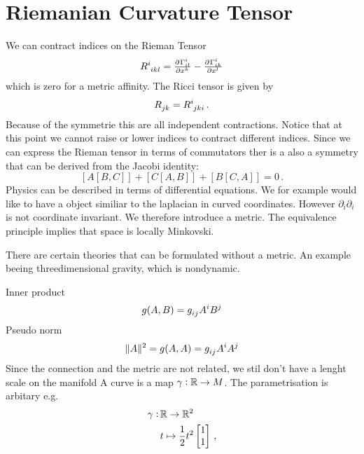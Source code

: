 \section{Riemanian Curvature Tensor}
We can contract indices on the Rieman Tensor
\begin{equation}
\tensor{R}{^i_i_k_l}=\pd{{\Gamma^i_{il}}}{{x^k}}-\pd{{\Gamma^i_{ik}}}{{x^l}}
\end{equation}
which is zero for a metric affinity. The Ricci tensor is given by
\begin{equation}
\tensor{R}{_j_k}=\tensor{R}{^i_j_k_i}\, .
\end{equation}
Because of the symmetrie this are all independent contractions. Notice that at
this point we cannot raise or lower indices to contract different indices.
Since we can express the Rieman tensor in terms of commutators ther is a also a
symmetry that can be derived from the Jacobi identity:
\begin{equation}
\left[A\left[B,C\right]\right]
+\left[C\left[A,B\right]\right]
+\left[B\left[C,A\right]\right]=0\,.
\end{equation}
Physics can be described in terms of differential equations. We for example
would like to have a object similiar to the laplacian in curved coordinates.
However $\partial_i\partial_i$ is not coordinate invariant. We therefore
introduce a metric. The equivalence principle implies that space is locally
Minkovski.
\begin{sidenote}
There are certain theories that can be formulated without a metric. An example
beeing threedimensional gravity, which is nondynamic. 
\end{sidenote}
Inner product 
\begin{equation}
g(A,B)=\tensor{g}{_i_j}\tensor{A}{^i}\tensor{B}{^j}
\end{equation}
Pseudo norm
\begin{equation}
\|A\|^2=g(A,A)=\tensor{g}{_i_j}\tensor{A}{^i}\tensor{A}{^j}
\end{equation}
Since the connection and the metric are not related, we stil don't have a lenght
scale on the manifold
A curve is a map $\gamma:\mathbb{R}\to M$. The parametrisation is arbitary e.g.
\begin{equation}
\begin{split}
\gamma:\, &\mathbb{R}\to \mathbb{R}^2\\
& t\mapsto
\frac{1}{2} t^2
\begin{bmatrix}
1 \\
1
\end{bmatrix}\, ,
\end{split}
\end{equation}
